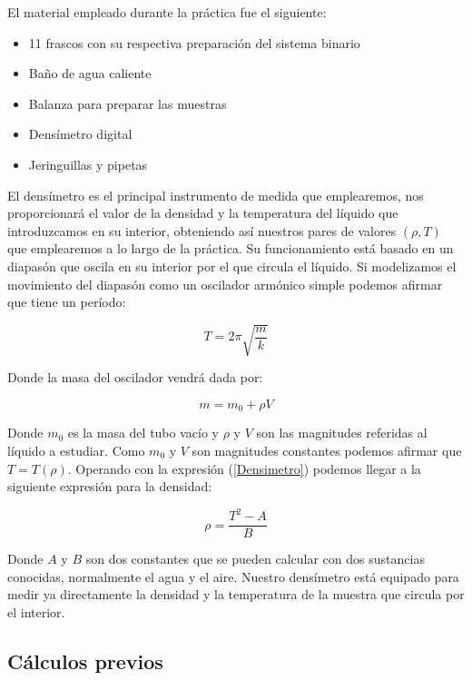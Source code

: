\documentclass[a4paper,12pt,titlepage]{article}
\begin{document}
El material empleado durante la práctica fue el siguiente:

\begin{itemize}
    \item 11 frascos con su respectiva preparación del sistema binario
    \item Baño de agua caliente
    \item Balanza para preparar las muestras
    \item Densímetro digital
    \item Jeringuillas y pipetas
\end{itemize}

El densímetro es el principal instrumento de medida que emplearemos, nos proporcionará el valor de la densidad y la temperatura del líquido que introduzcamos en su interior, obteniendo así nuestros pares de valores $(\rho,T)$ que emplearemos a lo largo de la práctica. Su funcionamiento está basado en un diapasón que oscila en su interior por el que circula el líquido. Si modelizamos el movimiento del diapasón como un oscilador armónico simple podemos afirmar que tiene un período:

\begin{equation}
    T = 2\pi \sqrt{\frac{m}{k}}
    \label{Densimetro}
\end{equation}

Donde la masa del oscilador vendrá dada por:

\begin{equation}
    m = m_0 + \rho V
\end{equation}

Donde $m_0$ es la masa del tubo vacío y $\rho$ y $V$ son las magnitudes referidas al líquido a estudiar. Como $m_0$ y $V$ son magnitudes constantes podemos afirmar que $T=T(\rho)$. Operando con la expresión (\ref{Densimetro}) podemos llegar a la siguiente expresión para la densidad:

\begin{equation}
    \rho = \frac{T^2-A}{B}
\end{equation}

Donde $A$ y $B$ son dos constantes que se pueden calcular con dos sustancias conocidas, normalmente el agua y el aire. Nuestro densímetro está equipado para medir ya directamente la densidad y la temperatura de la muestra que circula por el interior.

\subsection{Cálculos previos}
\end{document}
